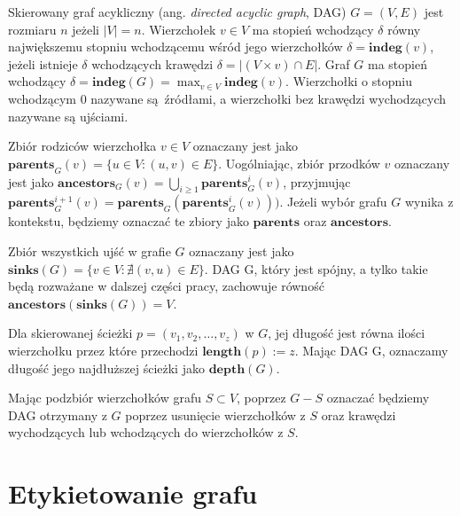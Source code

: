 Skierowany graf acykliczny (ang. \textit{directed acyclic graph}, DAG) $G = (V, E)$ jest rozmiaru $n$ jeżeli $|V| = n$.
Wierzchołek $v \in V$ ma stopień wchodzący $\delta$ równy największemu stopniu wchodzącemu wśród jego wierzchołków $\delta = \mathbf{indeg}(v)$, jeżeli istnieje $\delta$ wchodzących krawędzi $\delta = | \left( V \times {v} \right) \cap E|$.
Graf $G$ ma stopień wchodzący $ \delta = \mathbf{indeg}(G) = \max_{v \in V} \mathbf{indeg}(v)$.
Wierzchołki o stopniu wchodzącym 0 nazywane są źródłami, a wierzchołki bez krawędzi wychodzących nazywane są ujściami.

Zbiór rodziców wierzchołka $v \in V$ oznaczany jest jako $\mathbf{parents}_{G}(v) = \{ u \in V: (u, v) \in E \}$.
Uogólniając, zbiór przodków $v$ oznaczany jest jako $\mathbf{ancestors}_{G}(v) = \bigcup_{i \geq 1}\mathbf{parents}_{G}^{i}(v)$, przyjmując $\mathbf{parents}_{G}^{i+1}(v) = \mathbf{parents}_{G}(\mathbf{parents}_{G}^{i}(v)))$. Jeżeli wybór grafu $G$ wynika z kontekstu, będziemy oznaczać te zbiory jako $\mathbf{parents}$ oraz $\mathbf{ancestors}$.

Zbiór wszystkich ujść w grafie $G$ oznaczany jest jako $\mathbf{sinks}(G) = \{ v \in V : \nexists (v, u) \in E \}$. DAG G, który jest spójny, a tylko takie będą rozważane w dalszej części pracy, zachowuje równość $\mathbf{ancestors}(\mathbf{sinks}(G)) = V$.

Dla skierowanej ścieżki $p = (v_{1},v_{2},\dots,v_{z})$ w $G$, jej długość jest równa ilości wierzchołku przez które przechodzi $\mathbf{length}(p) := z$.
Mając DAG G, oznaczamy długość jego najdłuższej ścieżki jako $\mathbf{depth}(G)$.

Mając podzbiór wierzchołków grafu $S \subset V$, poprzez $G - S$ oznaczać będziemy DAG otrzymany z $G$ poprzez usunięcie wierzchołków z $S$ oraz krawędzi wychodzących lub wchodzących do wierzchołków z $S$.

\section{Etykietowanie grafu}

